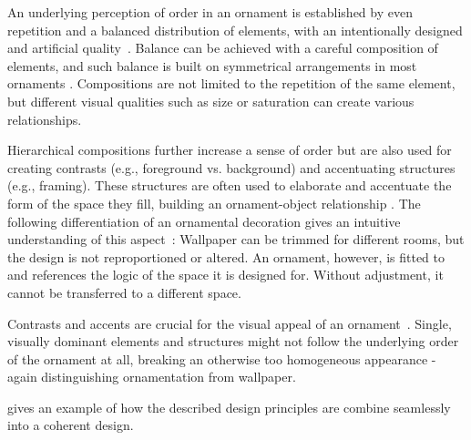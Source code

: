 An underlying perception of order in an ornament is established by even repetition and a balanced distribution of elements, with an intentionally designed and artificial quality~\cite{ward_1896_tpo}. Balance can be achieved with a careful composition of elements, and such balance is built on symmetrical arrangements in most ornaments \cite{gieseke_2017_ooo}. Compositions are not limited to the repetition of the same element, but different visual qualities such as size or saturation can create various relationships. 


Hierarchical compositions further increase a sense of order but are also used for creating contrasts (e.g., foreground vs. background) and accentuating structures (e.g., framing). These structures are often used to elaborate and accentuate the form of the space they fill, building an ornament-object relationship \cite{arbruzzo_2006_dec}. The following differentiation of an ornamental decoration gives an intuitive understanding of this aspect~\cite{arbruzzo_2006_dec}: Wallpaper can be trimmed for different rooms, but the design is not reproportioned or altered. An ornament, however, is fitted to and references the logic of the space it is designed for. Without adjustment, it cannot be transferred to a different space.

Contrasts and accents are crucial for the visual appeal of an ornament~\cite{wong_1998_cgf,ward_1896_tpo, moughtin_1999_udo}. Single, visually dominant elements and structures might not follow the underlying order of the ornament at all, breaking an otherwise too homogeneous appearance - again distinguishing ornamentation from wallpaper.

 gives an example of how the described design principles are combine seamlessly into a coherent design.

